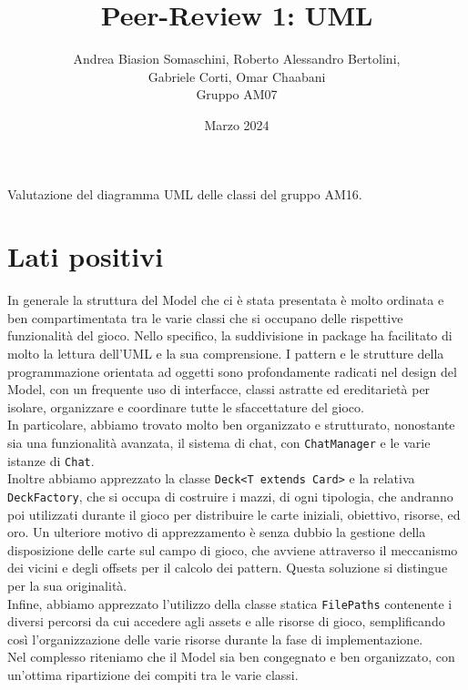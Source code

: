 \documentclass[12pt]{article}
\title{Peer-Review 1: UML}
\author{Andrea Biasion Somaschini, Roberto Alessandro Bertolini,\\ Gabriele Corti, Omar Chaabani\\Gruppo AM07}
\date{Marzo 2024}
\begin{document}
\maketitle

Valutazione del diagramma UML delle classi del gruppo AM16.

\newpage

\section{Lati positivi}
%
%
In generale la struttura del Model che ci è stata presentata è molto ordinata e ben compartimentata tra le varie classi che si occupano delle rispettive funzionalità del gioco. Nello specifico, la suddivisione in package ha facilitato di molto la lettura dell'UML e la sua comprensione.
I pattern e le strutture della programmazione orientata ad oggetti sono profondamente radicati nel design del Model, con un frequente uso di interfacce, classi astratte ed ereditarietà per isolare, organizzare e coordinare tutte le sfaccettature del gioco.\\
In particolare, abbiamo trovato molto ben organizzato e strutturato, nonostante sia una funzionalità avanzata, il sistema di chat, con \texttt{ChatManager} e le varie istanze di \texttt{Chat}.\\
Inoltre abbiamo apprezzato la classe \texttt{Deck<T extends Card>} e la relativa \texttt{DeckFactory}, che si occupa di costruire i mazzi, di ogni tipologia, che andranno poi utilizzati durante il gioco per distribuire le carte iniziali, obiettivo, risorse, ed oro. Un ulteriore motivo di apprezzamento è senza dubbio la gestione della disposizione delle carte sul campo di gioco, che avviene attraverso il meccanismo dei vicini e degli offsets per il calcolo dei pattern. Questa soluzione si distingue per la sua originalità.\\
Infine, abbiamo apprezzato l'utilizzo della classe statica \texttt{FilePaths} contenente i diversi percorsi da cui accedere agli assets e alle risorse di gioco, semplificando così l'organizzazione delle varie risorse durante la fase di implementazione.\\
Nel complesso riteniamo che il Model sia ben congegnato e ben organizzato, con un'ottima ripartizione dei compiti tra le varie classi.
\end{document}
